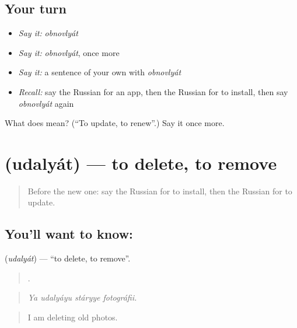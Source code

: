 \subsection*{Your turn}
\begin{itemize}
\raggedright
  \item \emph{Say it:} \emph{obnovlyát}
  \item \emph{Say it:} \emph{obnovlyát}, once more
  \item \emph{Say it:} a sentence of your own with \emph{obnovlyát}
  \item \emph{Recall:} say the Russian for an app, then the Russian for to install, then say \emph{obnovlyát} again
\end{itemize}

\begin{tcolorbox}[breakable,colback=teal!4,colframe=teal!35!black,title={Before you move on}]
What does  mean? (\textquotedblleft{}To update, to renew\textquotedblright{}.) Say it once more.
\end{tcolorbox}
\section[\texorpdfstring{\ru{удалять} (udalyát)}{удалять (udalyát)}]{ (udalyát) — to delete, to remove}

\label{lesson:RU-C401-udalyat}



\begin{quote}
Before the new one: say the Russian for to install, then the Russian for to update.
\end{quote}

\subsection*{You'll want to know: }
\textbf{} (\emph{udalyát}) — \textquotedblleft{}to delete, to remove\textquotedblright{}.

\begin{quote}
   .
\end{quote}

\begin{quote}
\emph{Ya udalyáyu stáryye fotográfii.}
\end{quote}

\begin{quote}
I am deleting old photos.
\end{quote}

